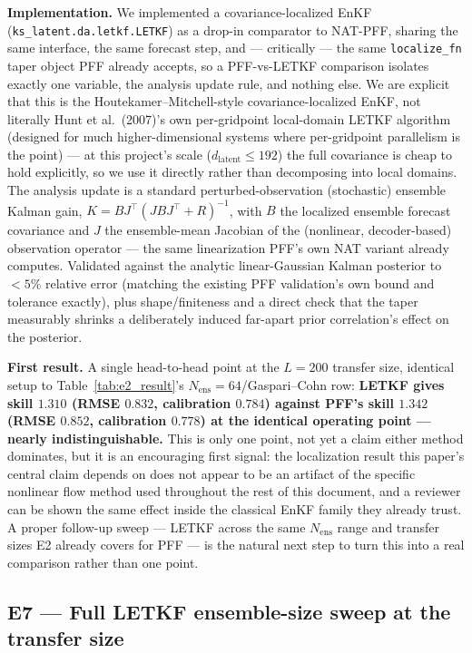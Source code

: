 \documentclass[11pt]{article}
\begin{document}
\textbf{Implementation.} We implemented a covariance-localized EnKF
(\texttt{ks\_latent.da.letkf.LETKF}) as a drop-in comparator to NAT-PFF,
sharing the same interface, the same forecast step, and --- critically
--- the same \texttt{localize\_fn} taper object PFF already accepts, so
a PFF-vs-LETKF comparison isolates exactly one variable, the analysis
update rule, and nothing else. We are explicit that this is the
Houtekamer--Mitchell-style covariance-localized EnKF, not literally
Hunt et al.\ (2007)'s own per-gridpoint local-domain LETKF algorithm
(designed for much higher-dimensional systems where per-gridpoint
parallelism is the point) --- at this project's scale
($d_{\mathrm{latent}}\leq192$) the full covariance is cheap to hold
explicitly, so we use it directly rather than decomposing into local
domains. The analysis update is a standard perturbed-observation
(stochastic) ensemble Kalman gain, $K = B J^\top(JBJ^\top+R)^{-1}$,
with $B$ the localized ensemble forecast covariance and $J$ the
ensemble-mean Jacobian of the (nonlinear, decoder-based) observation
operator --- the same linearization PFF's own NAT variant already
computes. Validated against the analytic linear-Gaussian Kalman
posterior to $<5\%$ relative error (matching the existing PFF
validation's own bound and tolerance exactly), plus shape/finiteness
and a direct check that the taper measurably shrinks a deliberately
induced far-apart prior correlation's effect on the posterior.

\textbf{First result.} A single head-to-head point at the $L=200$
transfer size, identical setup to Table~\ref{tab:e2_result}'s
$N_{\mathrm{ens}}=64$/Gaspari--Cohn row: \textbf{LETKF gives skill
$1.310$ (RMSE $0.832$, calibration $0.784$) against PFF's skill
$1.342$ (RMSE $0.852$, calibration $0.778$) at the identical operating
point --- nearly indistinguishable.} This is only one point, not yet a
claim either method dominates, but it is an encouraging first signal:
the localization result this paper's central claim depends on does not
appear to be an artifact of the specific nonlinear flow method used
throughout the rest of this document, and a reviewer can be shown the
same effect inside the classical EnKF family they already trust. A
proper follow-up sweep --- LETKF across the same $N_{\mathrm{ens}}$
range and transfer sizes E2 already covers for PFF --- is the natural
next step to turn this into a real comparison rather than one point.

\subsection{E7 --- Full LETKF ensemble-size sweep at the transfer size}
\label{exp:e7}
\end{document}
